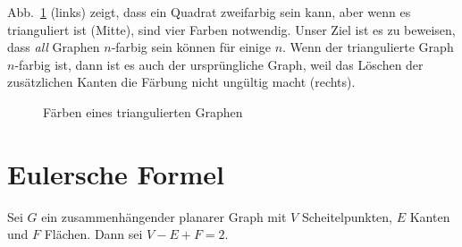 \begin{example}
Abb.~\ref{f.five-triangular-graph} (links) zeigt, dass ein Quadrat zweifarbig sein kann, aber wenn es trianguliert ist (Mitte), sind vier Farben notwendig. Unser Ziel ist es zu beweisen, dass \emph{all} Graphen $n$-farbig sein können für einige $n$. Wenn der triangulierte Graph $n$-farbig ist, dann ist es auch der ursprüngliche Graph, weil das Löschen der zusätzlichen Kanten die Färbung nicht ungültig macht (rechts).
\end{example}

\begin{figure}[ht]
\begin{center}
\end{center}
\caption{Färben eines triangulierten Graphen}\label{f.five-triangular-graph}
\end{figure}

\section{Eulersche Formel}\label{s.euler}

\begin{theorem}\label{thm.euler} Sei $G$ ein zusammenhängender planarer Graph mit $V$ Scheitelpunkten, $E$ Kanten und $F$ Flächen. Dann sei $V-E+F=2$.
\end{theorem}

